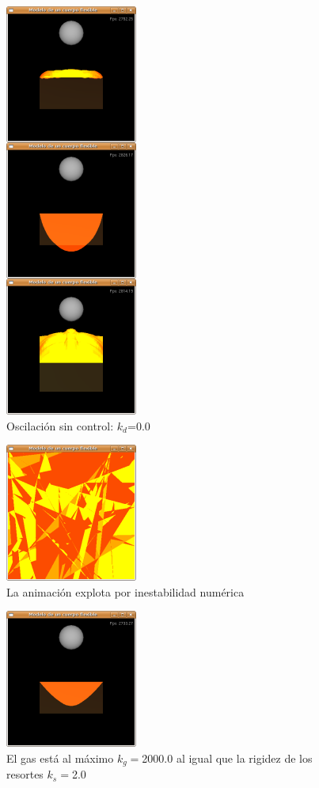 \begin{figure}
 \centering
 \includegraphics[]{Img/modRes1}
 \caption[Ejecución sin fuerza de amortiguamiento]{Oscilación sin control: $k_d$=0.0}
 \label{res:test1}
\end{figure}

\begin{figure}
 \centering
 \includegraphics[]{Img/modRes4}
 \caption[Explosión por inestabilidad numérica]{La animación explota por inestabilidad numérica}
 \label{res:test4}
\end{figure}

\begin{figure}
 \centering
 \includegraphics[]{Img/modRes5}
 \caption[Ejecución con fuerza del gas y rigidez al máximo]{El gas está al máximo $k_g=$2000.0 al igual que la rigidez de los resortes $k_s=$2.0}
 \label{res:test5}
\end{figure}

